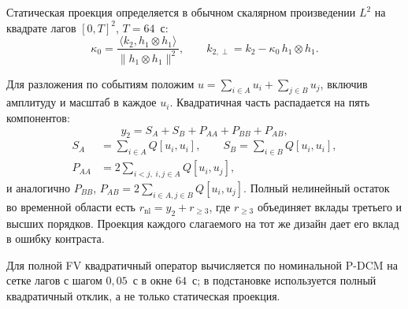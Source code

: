 Статическая проекция определяется в обычном скалярном произведении $L^2$ на квадрате лагов $[0,T]^2$, $T=64$~с:
\begin{equation}\label{eq:kappa}
\kappa_0=\frac{\langle k_2,h_1\otimes h_1\rangle}{\|h_1\otimes h_1\|^2},\qquad
k_{2,\perp}=k_2-\kappa_0\, h_1\otimes h_1.
\end{equation}

Для разложения по событиям положим $u=\sum_{i\in A}u_i+\sum_{j\in B}u_j$, включив амплитуду и масштаб в каждое $u_i$. Квадратичная часть распадается на пять компонентов:
\begin{equation}\label{eq:five}
y_2=S_A+S_B+P_{AA}+P_{BB}+P_{AB},
\end{equation}
\begin{equation}\label{eq:fiveb}
\begin{split}
S_A&=\sum_{i\in A}Q[u_i,u_i],\qquad S_B=\sum_{i\in B}Q[u_i,u_i],\\
P_{AA}&=2\sum_{i<j,\;i,j\in A}Q[u_i,u_j],
\end{split}
\end{equation}
и аналогично $P_{BB}$, $P_{AB}=2\sum_{i\in A,j\in B}Q[u_i,u_j]$. Полный нелинейный остаток во временной области есть $r_{\mathrm{nl}}=y_2+r_{\ge3}$, где $r_{\ge3}$ объединяет вклады третьего и высших порядков. Проекция каждого слагаемого на тот же дизайн дает его вклад в ошибку контраста.

Для полной FV квадратичный оператор вычисляется по номинальной P-DCM на сетке лагов с шагом $0{,}05$~с в окне $64$~с; в подстановке используется полный квадратичный отклик, а не только статическая проекция.
